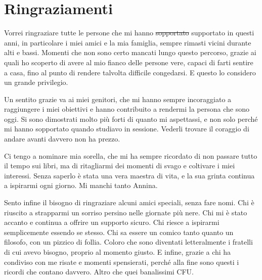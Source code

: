 \rhead[\fancyplain{}{\bfseries \leftmark}]{\fancyplain{}{\bfseries
\thepage}}

\clearpage{\pagestyle{empty}\cleardoublepage}
\chapter*{Ringraziamenti}
\thispagestyle{empty}



Vorrei ringraziare tutte le persone che mi hanno \sout{sopportato} supportato in questi anni, in particolare i miei amici e la mia famiglia, sempre rimasti vicini durante alti e bassi. Momenti che non sono certo mancati lungo questo percorso, grazie ai quali ho scoperto di avere al mio fianco delle persone vere, capaci di farti sentire a casa, fino al punto di rendere talvolta difficile congedarsi. E questo lo considero un grande privilegio.

Un sentito grazie va ai miei genitori, che mi hanno sempre incoraggiato a raggiungere i miei obiettivi e hanno contribuito a rendermi la persona che sono oggi. Si sono dimostrati molto più forti di quanto mi aspettassi, e non solo perché mi hanno sopportato quando studiavo in sessione. Vederli trovare il coraggio di andare avanti davvero non ha prezzo.

Ci tengo a nominare mia sorella, che mi ha sempre ricordato di non passare tutto il tempo sui libri, ma di ritagliarmi dei momenti di svago e coltivare i miei interessi. Senza saperlo è stata una vera maestra di vita, e la sua grinta continua a ispirarmi ogni giorno. Mi manchi tanto Annina.

Sento infine il bisogno di ringraziare alcuni amici speciali, senza fare nomi. Chi è riuscito a strapparmi un sorriso persino nelle giornate più nere. Chi mi è stato accanto e continua a offrire un supporto sicuro. Chi riesce a ispirarmi semplicemente essendo se stesso. Chi sa essere un comico tanto quanto un filosofo, con un pizzico di follia. Coloro che sono diventati letteralmente i fratelli di cui avevo bisogno, proprio al momento giusto. E infine, grazie a chi ha condiviso con me risate e momenti spensierati, perché alla fine sono questi i ricordi che contano davvero. Altro che quei banalissimi CFU.
